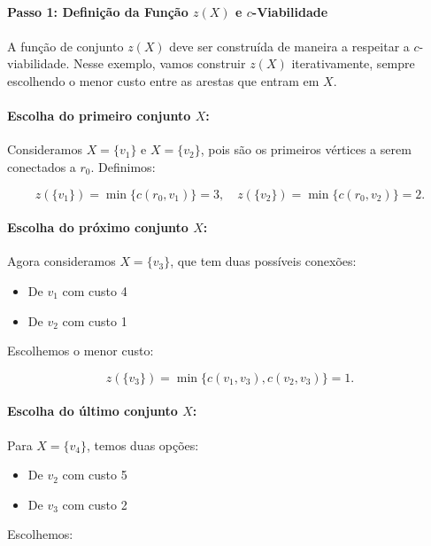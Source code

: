\documentclass[12pt,a4paper]{article}
\begin{document}
\paragraph{}
\textbf{Passo 1: Definição da Função \( z(X) \) e \( c \)-Viabilidade}

\paragraph{}
A função de conjunto \( z(X) \) deve ser construída de maneira a respeitar a \( c \)-viabilidade. Nesse exemplo, vamos construir \( z(X) \) iterativamente, sempre escolhendo o menor custo entre as arestas que entram em \( X \).

\paragraph{Escolha do primeiro conjunto \( X \):}
Consideramos \( X = \{ v_1 \} \) e \( X = \{ v_2 \} \), pois são os primeiros vértices a serem conectados a \( r_0 \). Definimos:

\[
z(\{ v_1 \}) = \min \{ c(r_0, v_1) \} = 3, \quad z(\{ v_2 \}) = \min \{ c(r_0, v_2) \} = 2.
\]

\paragraph{Escolha do próximo conjunto \( X \):}
Agora consideramos \( X = \{ v_3 \} \), que tem duas possíveis conexões:
\begin{itemize}
    \item De \( v_1 \) com custo 4
    \item De \( v_2 \) com custo 1
\end{itemize}

Escolhemos o menor custo:

\[
z(\{ v_3 \}) = \min \{ c(v_1, v_3), c(v_2, v_3) \} = 1.
\]

\paragraph{Escolha do último conjunto \( X \):}
Para \( X = \{ v_4 \} \), temos duas opções:
\begin{itemize}
    \item De \( v_2 \) com custo 5
    \item De \( v_3 \) com custo 2
\end{itemize}

Escolhemos:
\end{document}

